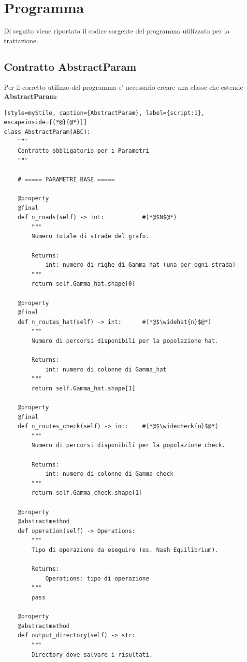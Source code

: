 \section{Programma}
\label{sec:Programma}

Di seguito viene riportato il codice sorgente del programma utilizzato per la trattazione.

\subsection{Contratto AbstractParam}
\label{subsec:AbstractParam}

Per il corretto utilizzo del programma e' necessario creare una classe che estende \textbf{AbstractParam}:
\begin{lstlisting}[style=myStile, caption={AbstractParam}, label={script:1}, escapeinside={(*@}{@*)}]
class AbstractParam(ABC):
    """
    Contratto obbligatorio per i Parametri
    """

    # ===== PARAMETRI BASE =====
    
    @property
    @final
    def n_roads(self) -> int:           #(*@$N$@*)
        """
        Numero totale di strade del grafo.
        
        Returns:
            int: numero di righe di Gamma_hat (una per ogni strada)
        """
        return self.Gamma_hat.shape[0]

    @property
    @final
    def n_routes_hat(self) -> int:      #(*@$\widehat{n}$@*)
        """
        Numero di percorsi disponibili per la popolazione hat.
        
        Returns:
            int: numero di colonne di Gamma_hat
        """
        return self.Gamma_hat.shape[1]

    @property
    @final
    def n_routes_check(self) -> int:    #(*@$\widecheck{n}$@*)
        """
        Numero di percorsi disponibili per la popolazione check.
        
        Returns:
            int: numero di colonne di Gamma_check
        """
        return self.Gamma_check.shape[1]

    @property
    @abstractmethod
    def operation(self) -> Operations:
        """
        Tipo di operazione da eseguire (es. Nash Equilibrium).
        
        Returns:
            Operations: tipo di operazione
        """
        pass

    @property
    @abstractmethod
    def output_directory(self) -> str:
        """
        Directory dove salvare i risultati.
        

\end{lstlisting}

